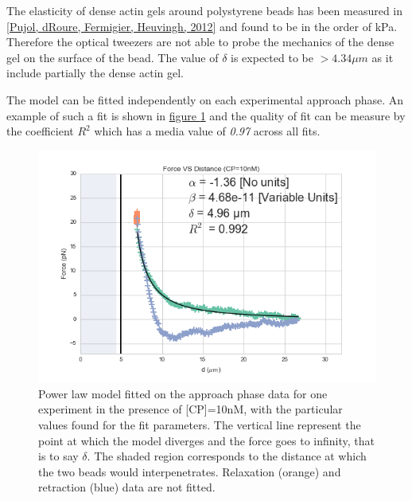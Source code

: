 \documentclass[A4paperpaper,11pt,english]{sphinxmanual}
\begin{document}
The elasticity of dense actin gels around polystyrene beads has been measured
in {\hyperref[index-latex:pujol2012]{{[}Pujol, dRoure, Fermigier, Heuvingh,  2012{]}}} and found to be in the order of kPa.  Therefore the
optical tweezers are not able to probe the mechanics of the dense gel on the
surface of the bead. The value of \(\delta\)  is expected to be \(> 4.34 \mu{}m\) as it include partially the dense actin gel.

The model can be fitted independently on each experimental
approach phase. An example of such a fit is shown in
\hyperref[index-latex:force-distance-fit]{figure  \ref*{index-latex:force-distance-fit}} and the quality of fit can be measure by the
coefficient \(R^2\) which has a media value of \emph{0.97}
across all fits.
\begin{figure}[htbp]
\centering
\capstart

\includegraphics[width=1.000\linewidth]{force-distance-fit.png}
\caption{Power law model fitted on the approach phase data for one experiment in the
presence of {[}CP{]}=10nM, with the particular values found for the fit
parameters.  The vertical line represent the point at which the model
diverges and the force goes to infinity, that is to say \(\delta\). The
shaded region corresponds to the distance at which the two beads would
interpenetrates. Relaxation (orange) and retraction (blue) data are not fitted.}\label{index-latex:force-distance-fit}\end{figure}
\end{document}
